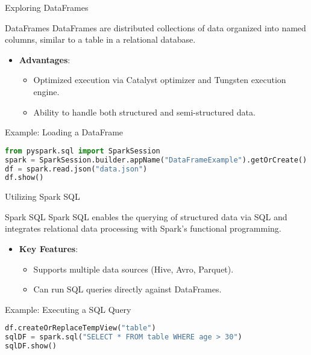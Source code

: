 \documentclass[aspectratio=169]{beamer}
\begin{document}
\begin{frame}[fragile]{Exploring DataFrames}
    \begin{block}{DataFrames}
        DataFrames are distributed collections of data organized into named columns, similar to a table in a relational database.
    \end{block}
    
    \begin{itemize}
        \item \textbf{Advantages}:
        \begin{itemize}
            \item Optimized execution via Catalyst optimizer and Tungsten execution engine.
            \item Ability to handle both structured and semi-structured data.
        \end{itemize}
    \end{itemize}
    
    \begin{block}{Example: Loading a DataFrame}
        \begin{lstlisting}[language=python]
from pyspark.sql import SparkSession
spark = SparkSession.builder.appName("DataFrameExample").getOrCreate()
df = spark.read.json("data.json")
df.show()
        \end{lstlisting}
    \end{block}
\end{frame}

\begin{frame}[fragile]{Utilizing Spark SQL}
    \begin{block}{Spark SQL}
        Spark SQL enables the querying of structured data via SQL and integrates relational data processing with Spark's functional programming.
    \end{block}
    
    \begin{itemize}
        \item \textbf{Key Features}:
        \begin{itemize}
            \item Supports multiple data sources (Hive, Avro, Parquet).
            \item Can run SQL queries directly against DataFrames.
        \end{itemize}
    \end{itemize}
    
    \begin{block}{Example: Executing a SQL Query}
        \begin{lstlisting}[language=python]
df.createOrReplaceTempView("table")
sqlDF = spark.sql("SELECT * FROM table WHERE age > 30")
sqlDF.show()
        \end{lstlisting}
    \end{block}
\end{frame}
\end{document}
